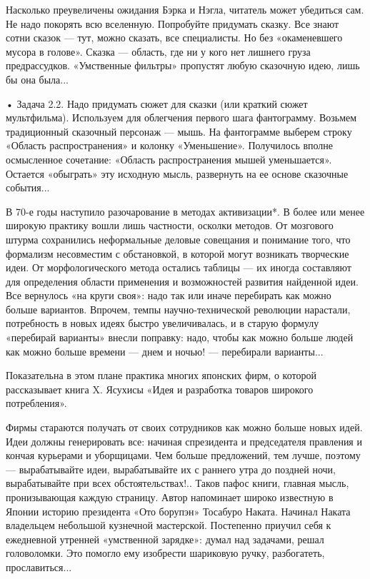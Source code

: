 Насколько  преувеличены   ожидания  Бэрка  и  Нэгла,   читатель  может
убедиться сам.  Не надо  покорять всю вселенную.  Попробуйте придумать
сказку. Все знают сотни сказок  — тут, можно сказать, все специалисты.
Но без «окаменевшего мусора в голове». Сказка — область, где ни у кого
нет лишнего груза предрассудков.  «Умственные фильтры» пропустят любую
сказочную идею, лишь бы она была...

•  Задача 2.2.  Надо придумать  сюжет  для сказки  (или краткий  сюжет
мультфильма).  Используем  для  облегчения первого  шага  фантограмму.
Возьмем  традиционный  сказочный  персонаж   —  мышь.  На  фантограмме
выберем  строку  «Область  распространения»  и  колонку  «Уменьшение».
Получилось  вполне  осмысленное  сочетание:  «Область  распространения
мышей уменьшается». Остается «обыграть» эту исходную мысль, развернуть
на ее основе сказочные события...


В 70-е  годы наступило разочарование  в методах активизации*.  В более
или  менее широкую  практику  вошли лишь  частности, осколки  методов.
От  мозгового  штурма  сохранились неформальные  деловые  совещания  и
понимание  того, что  формализм несовместим  с обстановкой,  в которой
могут возникать  творческие идеи. От морфологического  метода остались
таблицы —  их иногда составляют  для определения области  применения и
возможностей развития  найденной идеи. Все вернулось  «на круги своя»:
надо так  или иначе  перебирать как  можно больше  вариантов. Впрочем,
темпы  научно-технической  революции  нарастали, потребность  в  новых
идеях быстро  увеличивалась, и  в старую формулу  «перебирай варианты»
внесли поправку: надо,  чтобы как можно больше людей  как можно больше
времени — днем и ночью! — перебирали варианты...

Показательна в  этом плане  практика многих  японских фирм,  о которой
рассказывает  книга X.  Ясухисы  «Идея и  разработка товаров  широкого
потребления».

Фирмы стараются получать  от своих сотрудников как  можно больше новых
идей. Идеи должны генерировать все: начиная спрезидента и председателя
правления и кончая курьерами и уборщицами. Чем больше предложений, тем
лучше, поэтому —  вырабатывайте идеи, вырабатывайте их  с раннего утра
до поздней ночи, вырабатывайте при всех обстоятельствах!.. Таков пафос
книги, главная мысль, пронизывающая  каждую страницу. Автор напоминает
широко известную  в Японии  историю президента «Ото  борупэн» Тосабуро
Наката.  Начинал  Наката  владельцем небольшой  кузнечной  мастерской.
Постепенно приучил  себя к  ежедневной утренней  «умственной зарядке»:
думал  над  задачами, решал  головоломки.  Это  помогло ему  изобрести
шариковую ручку, разбогатеть, прославиться...

